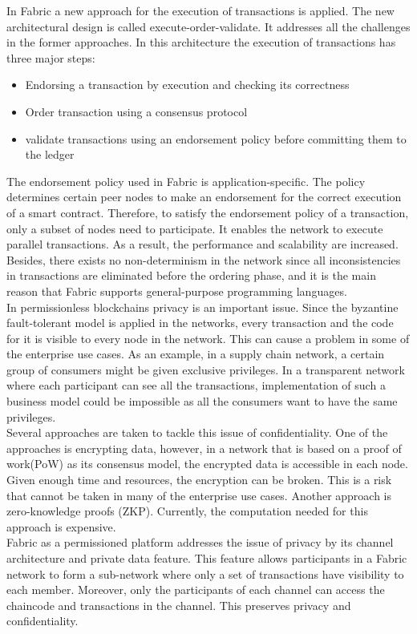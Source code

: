 \documentclass[sigconf,natbib=false]{acmart}
\begin{document}
    In Fabric a new approach for the execution of transactions is applied. The new architectural design is called execute-order-validate. It addresses all the challenges in the former approaches. In this architecture the execution of transactions has three major steps:
    \begin{itemize}
        \item Endorsing a transaction by execution and checking its correctness
        \item Order transaction using a consensus protocol
        \item validate transactions using an endorsement policy before committing them to the ledger
    \end{itemize}
    The endorsement policy used in Fabric is application-specific. The policy determines certain peer nodes to make an endorsement for the correct execution of a smart contract. Therefore, to satisfy the endorsement policy of a transaction, only a subset of nodes need to participate. It enables the network to execute parallel transactions. As a result, the performance and scalability are increased. Besides, there exists no non-determinism in the network since all inconsistencies in transactions are eliminated before the ordering phase, and it is the main reason that Fabric supports general-purpose programming languages.\\
    In permissionless blockchains privacy is an important issue. Since the byzantine fault-tolerant model is applied in the networks, every transaction and the code for it is visible to every node in the network. This can cause a problem in some of the enterprise use cases. As an example, in a supply chain network, a certain group of consumers might be given exclusive privileges. In a transparent network where each participant can see all the transactions, implementation of such a business model could be impossible as all the consumers want to have the same privileges.\\
    Several approaches are taken to tackle this issue of confidentiality. One of the approaches is encrypting data, however, in a network that is based on a proof of work(PoW) as its consensus model, the encrypted data is accessible in each node. Given enough time and resources, the encryption can be broken. This is a risk that cannot be taken in many of the enterprise use cases. Another approach is zero-knowledge proofs (ZKP). Currently, the computation needed for this approach is expensive.\\
    Fabric as a permissioned platform addresses the issue of privacy by its channel architecture and private data feature. This feature allows participants in a Fabric network to form a sub-network where only a set of transactions have visibility to each member. Moreover, only the participants of each channel can access the chaincode and transactions in the channel. This preserves privacy and confidentiality.\cite{hyperledgerIntroduction}
\end{document}
